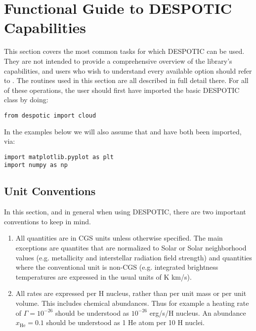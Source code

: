 \documentclass[letterpaper,10pt,english]{sphinxmanual}
\begin{document}
\chapter{Functional Guide to DESPOTIC Capabilities}
\label{functions:functional-guide-to-despotic-capabilities}\label{functions::doc}
This section covers the most common tasks for which DESPOTIC can be
used. They are not intended to provide a comprehensive overview of the
library's capabilities, and users who wish to understand every
available option should refer to {\hyperref[fulldoc:sec\string-fulldoc]{}}. The routines used in
this section are all described in full detail there. For all of these
operations, the user should first have imported the basic DESPOTIC
class  by doing:

\begin{Verbatim}[commandchars=\\\{\}]
from despotic import cloud
\end{Verbatim}

In the examples below we will also assume that  and
 have both been imported, via:

\begin{Verbatim}[commandchars=\\\{\}]
import matplotlib.pyplot as plt
import numpy as np
\end{Verbatim}


\section{Unit Conventions}
\label{functions:unit-conventions}
In this section, and in general when using DESPOTIC, there are two
important conventions to keep in mind.
\begin{enumerate}
\item {} 
All quantities are in CGS units unless otherwise specified. The
main exceptions are quantites that are normalized to Solar or Solar
neighborhood values (e.g. metallicity and interstellar radiation
field strength) and quantities where the conventional unit is
non-CGS (e.g. integrated brightness temperatures are expressed in
the usual units of K km/s).

\item {} 
All rates are expressed per H nucleus, rather than per unit mass or
per unit volume. This includes chemical abundances. Thus for
example a heating rate of \(\Gamma=10^{-26}\) should be
understood as \(10^{-26}\) erg/s/H nucleus. An abundance
\(x_{\mathrm{He}}=0.1\) should be understood as 1 He atom per
10 H nuclei.

\end{enumerate}
\end{document}
